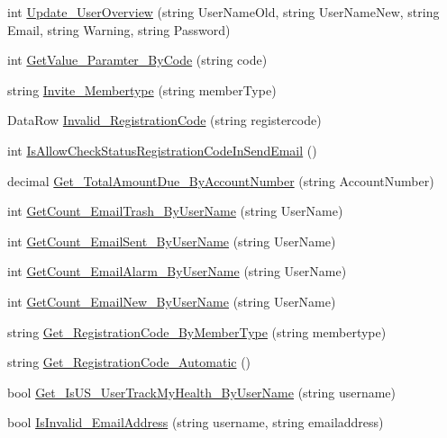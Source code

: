 \begin{DoxyCompactItemize}
\item 
int \hyperlink{class_d_b_class_accdb33f185e3d071c73ed1c8c05c8db0}{Update\-\_\-\-User\-Overview} (string User\-Name\-Old, string User\-Name\-New, string Email, string Warning, string Password)
\item 
int \hyperlink{class_d_b_class_a547a707a154ff5ce5620445a986f9d80}{Get\-Value\-\_\-\-Paramter\-\_\-\-By\-Code} (string code)
\item 
string \hyperlink{class_d_b_class_a780a2360541eac03a5f601e807daa315}{Invite\-\_\-\-Membertype} (string member\-Type)
\item 
Data\-Row \hyperlink{class_d_b_class_a4d51d814947ee0d6b8e4fc40c69a9042}{Invalid\-\_\-\-Registration\-Code} (string registercode)
\item 
int \hyperlink{class_d_b_class_a0e5e201e2c1a800ef5f3bd6d27735a10}{Is\-Allow\-Check\-Status\-Registration\-Code\-In\-Send\-Email} ()
\item 
decimal \hyperlink{class_d_b_class_a95cc7b89b936bed76372b6cee5fac8bb}{Get\-\_\-\-Total\-Amount\-Due\-\_\-\-By\-Account\-Number} (string Account\-Number)
\item 
int \hyperlink{class_d_b_class_aead8cbe00c4eae2083023a1d4064da98}{Get\-Count\-\_\-\-Email\-Trash\-\_\-\-By\-User\-Name} (string User\-Name)
\item 
int \hyperlink{class_d_b_class_aa7e7e02bfe40b7f2cbbcb968245bcedf}{Get\-Count\-\_\-\-Email\-Sent\-\_\-\-By\-User\-Name} (string User\-Name)
\item 
int \hyperlink{class_d_b_class_a8eca9d29902373dde46eb6ff616b7f42}{Get\-Count\-\_\-\-Email\-Alarm\-\_\-\-By\-User\-Name} (string User\-Name)
\item 
int \hyperlink{class_d_b_class_a9314af57c8a3bc7bc95233f67892ed81}{Get\-Count\-\_\-\-Email\-New\-\_\-\-By\-User\-Name} (string User\-Name)
\item 
string \hyperlink{class_d_b_class_ae23b78ebc687ddc3e6ed4cc7db52eec8}{Get\-\_\-\-Registration\-Code\-\_\-\-By\-Member\-Type} (string membertype)
\item 
string \hyperlink{class_d_b_class_a8b1c1583c7deaf27f452d121c1ad06b3}{Get\-\_\-\-Registration\-Code\-\_\-\-Automatic} ()
\item 
bool \hyperlink{class_d_b_class_a18ad84f7d11d749b4a1d7eb633b5e6b4}{Get\-\_\-\-Is\-U\-S\-\_\-\-User\-Track\-My\-Health\-\_\-\-By\-User\-Name} (string username)
\item 
bool \hyperlink{class_d_b_class_ae14263d3318dc4b2ed3747c677bf98a2}{Is\-Invalid\-\_\-\-Email\-Address} (string username, string emailaddress)

\end{DoxyCompactItemize}
